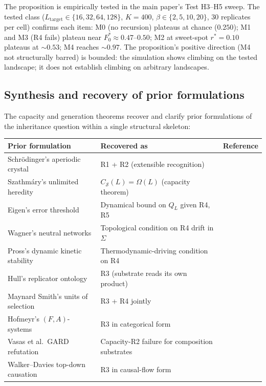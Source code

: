\documentclass[11pt]{article}
\theoremstyle{plain}
\theoremstyle{definition}
\newcommand{\Csub}{C_{\mathcal{S}}}
\begin{document}
The proposition is empirically tested in the main paper's Test H3--H5 sweep. The tested class ($L_{\mathrm{target}} \in \{16, 32, 64, 128\}$, $K = 400$, $\beta \in \{2, 5, 10, 20\}$, 30 replicates per cell) confirms each item: M0 (no recursion) plateaus at chance ($0.250$); M1 and M3 (R4 fails) plateau near $F_0^* \approx 0.47\text{--}0.50$; M2 at sweet-spot $r^* = 0.10$ plateaus at $\sim 0.53$; M4 reaches $\sim 0.97$. The proposition's positive direction (M4 not structurally barred) is bounded: the simulation shows climbing on the tested landscape; it does not establish climbing on arbitrary landscapes.

\subsection{Synthesis and recovery of prior formulations}
\label{subsec:synthesis}

The capacity and generation theorems recover and clarify prior formulations of the inheritance question within a single structural skeleton:

\begin{center}
\begin{tabular}{lll}
\toprule
Prior formulation & Recovered as & Reference \\
\midrule
Schr\"odinger's aperiodic crystal & R1 + R2 (extensible recognition) & \citep{Schrodinger1944} \\
Szathm\'ary's unlimited heredity & $\Csub(L) = \Omega(L)$ (capacity theorem) & \citep{Szathmary2000} \\
Eigen's error threshold & Dynamical bound on $Q_L$ given R4, R5 & \citep{Eigen1971, EigenMcCaskillSchuster1989} \\
Wagner's neutral networks & Topological condition on R4 drift in $\Sigma$ & \citep{Wagner2005, Wagner2011} \\
Pross's dynamic kinetic stability & Thermodynamic-driving condition on R4 & \citep{Pross2011} \\
Hull's replicator ontology & R3 (substrate reads its own product) & \citep{Hull1980} \\
Maynard Smith's units of selection & R3 + R4 jointly & \citep{MaynardSmith2000} \\
Hofmeyr's $(F, A)$-systems & R3 in categorical form & \citep{Hofmeyr2017} \\
Vasas et al.\ GARD refutation & Capacity-R2 failure for composition substrates & \citep{Vasas2010} \\
Walker--Davies top-down causation & R3 in causal-flow form & \citep{WalkerDavies2013} \\
\bottomrule
\end{tabular}
\end{center}
\end{document}
